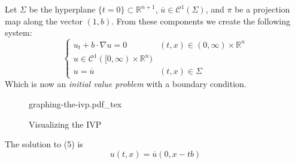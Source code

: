 \documentclass[12pt]{article}
\newcommand{\incfig}[2][1]{%
    \def\svgwidth{#1\columnwidth}
    {#2.pdf_tex}
}
\begin{document}
Let $\Sigma$ be the hyperplane $\{t=0\}\subset\mathbb{R}^{n+1}$, $\overline{u}\in\mathcal{C}^{1}(\Sigma)$, and $\pi$ be a projection map along the vector $(1,b)$. From these components we create the following system:
\begin{equation}
    \begin{cases}
        u_t+b\cdot\nabla u=0 & (t,x)\in(0,\infty)\times\mathbb{R}^n\\
        u\in\mathcal{C}^{1}([0,\infty)\times\mathbb{R}^{n})\\
        u=\overline{u} & (t,x)\in\Sigma
    \end{cases}
\end{equation}
Which is now an \emph{initial value problem} with a boundary condition.
\begin{figure}[htbp]
    \hspace{1.7cm}
        \incfig{graphing-the-ivp}
    \caption{Visualizing the IVP}
    \label{fig:graphing-the-ivp}
\end{figure}

\begin{theo}
    The solution to (5) is 
\[
    u(t,x)=\overline{u}(0,x-tb)
\]
\end{theo}
\end{document}
